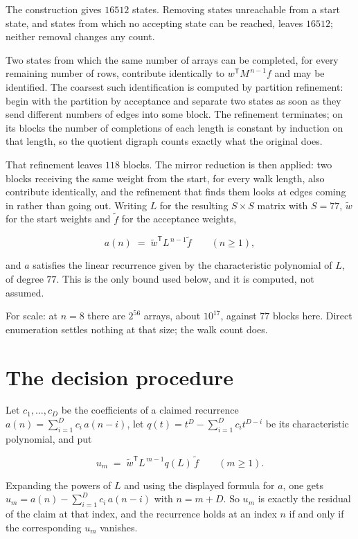 \documentclass[11pt]{article}
\theoremstyle{definition}
\begin{document}
The construction gives $16512$ states. Removing states unreachable from a start state, and states from which no accepting state can be reached, leaves $16512$; neither removal changes any count.

Two states from which the same number of arrays can be completed, for every remaining number of rows, contribute identically to $w^{\mathsf T}M^{\,n-1}f$ and may be identified. The coarsest such identification is computed by partition refinement: begin with the partition by acceptance and separate two states as soon as they send different numbers of edges into some block. The refinement terminates; on its blocks the number of completions of each length is constant by induction on that length, so the quotient digraph counts exactly what the original does.

That refinement leaves $118$ blocks. The mirror reduction is then applied: two blocks receiving the same weight from the start, for every walk length, also contribute identically, and the refinement that finds them looks at edges coming in rather than going out. Writing $L$ for the resulting $S \times S$ matrix with $S = 77$, $\tilde w$ for the start weights and $\tilde f$ for the acceptance weights,

\[a(n) \;=\; \tilde w^{\mathsf T} L^{\,n-1} \tilde f \qquad (n \ge 1),\]

and $a$ satisfies the linear recurrence given by the characteristic polynomial of $L$, of degree $77$. This is the only bound used below, and it is computed, not assumed.

For scale: at $n = 8$ there are $2^{56}$ arrays, about $10^{17}$, against $77$ blocks here. Direct enumeration settles nothing at that size; the walk count does.

\section{The decision procedure}

Let $c_1,\dots,c_D$ be the coefficients of a claimed recurrence $a(n) = \sum_{i=1}^{D} c_i\,a(n-i)$, let $q(t) = t^{D} - \sum_{i=1}^{D} c_i t^{D-i}$ be its characteristic polynomial, and put

\[u_m \;=\; \tilde w^{\mathsf T} L^{\,m-1} q(L)\,\tilde f \qquad (m \ge 1).\]

Expanding the powers of $L$ and using the displayed formula for $a$, one gets $u_m = a(n) - \sum_{i=1}^{D} c_i\,a(n-i)$ with $n = m + D$. So $u_m$ is exactly the residual of the claim at that index, and the recurrence holds at an index $n$ if and only if the corresponding $u_m$ vanishes.
\end{document}

